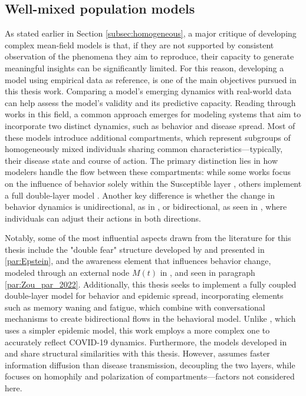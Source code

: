\subsection{Well-mixed population models}
As stated earlier in Section \ref{subsec:homogeneous}, a major critique of developing complex mean-field models is that, if they are not supported by consistent observation of the phenomena they aim to reproduce, their capacity to generate meaningful insights can be significantly limited. For this reason, developing a model using empirical data as reference, is one of the main objectives pursued in this thesis work. Comparing a model's emerging dynamics with real-world data can help assess the model's validity and its predictive capacity.
Reading through works in this field, a common approach emerges for modeling systems that aim to incorporate two distinct dynamics, such as behavior and disease spread. Most of these models introduce additional compartments, which represent subgroups of homogeneously mixed individuals sharing common characteristics—typically, their disease state and course of action. The primary distinction lies in how modelers handle the flow between these compartments: while some works focus on the influence of behavior solely within the Susceptible layer \cite{Epstein_2021, Tyson_2020, Zuo2022}, others implement a full double-layer model \cite{Bongarti2023, Bulai2023, Tanaka_2002}. Another key difference is whether the change in behavior dynamics is unidirectional, as in \cite{Bongarti2023}, or bidirectional, as seen in \cite{Epstein_2021, Tyson_2020, Tanaka_2002, Zuo2022}, where individuals can adjust their actions in both directions.

Notably, some of the most influential aspects drawn from the literature for this thesis include the "double fear" structure developed by \cite{Epstein_2021} and presented in \ref{par:Epstein}, and the awareness element that influences behavior change, modeled through an external node $M(t)$ in \cite{Zuo2022}, and seen in paragraph \ref{par:Zou_par_2022}. Additionally, this thesis seeks to implement a fully coupled double-layer model for behavior and epidemic spread, incorporating elements such as memory waning and fatigue, which combine with conversational mechanisms to create bidirectional flows in the behavioral model.
Unlike \cite{Tanaka_2002}, which uses a simpler epidemic model, this work employs a more complex one to accurately reflect COVID-19 dynamics. Furthermore, the models developed in \cite{Bulai2023} and \cite{Smaldino_2021} share structural similarities with this thesis. However, \cite{Bulai2023} assumes faster information diffusion than disease transmission, decoupling the two layers, while \cite{Smaldino_2021} focuses on homophily and polarization of compartments—factors not considered here.

